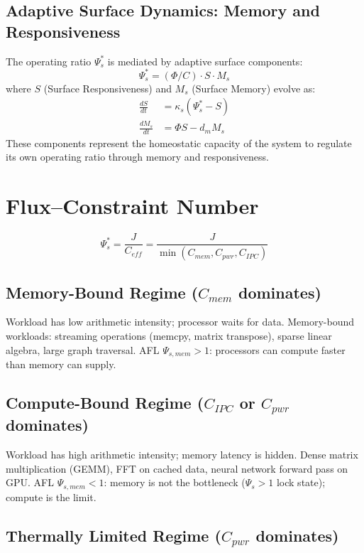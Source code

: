 \documentclass[11pt]{article}
\begin{document}
\subsection{Adaptive Surface Dynamics: Memory and Responsiveness}

The operating ratio $\Psi_s^*$ is mediated by adaptive surface components:
\begin{equation}
\Psi_s^* = (\Phi/C) \cdot S \cdot M_s
\end{equation}
where $S$ (Surface Responsiveness) and $M_s$ (Surface Memory) evolve as:
\begin{align}
\frac{dS}{dt} &= \kappa_s (\Psi_s^* - S) \\
\frac{dM_s}{dt} &= \Phi S - d_m M_s
\end{align}
These components represent the homeostatic capacity of the system to regulate its own operating ratio through memory and responsiveness.

\section{Flux--Constraint Number}

\begin{equation}
\Psi_s^* = \frac{J}{C_{eff}} = \frac{J}{\min(C_{mem}, C_{pwr}, C_{IPC})}
\end{equation}

\subsection{Memory-Bound Regime ($C_{mem}$ dominates)}

Workload has low arithmetic intensity; processor waits for data. Memory-bound workloads:
streaming operations (memcpy, matrix transpose), sparse linear algebra, large graph traversal.
AFL $\Psi_{s,mem} > 1$: processors can compute faster than memory can supply.

\subsection{Compute-Bound Regime ($C_{IPC}$ or $C_{pwr}$ dominates)}

Workload has high arithmetic intensity; memory latency is hidden. Dense matrix multiplication
(GEMM), FFT on cached data, neural network forward pass on GPU. AFL $\Psi_{s,mem} < 1$:
memory is not the bottleneck ($\Psi_s > 1$ lock state); compute is the limit.

\subsection{Thermally Limited Regime ($C_{pwr}$ dominates)}
\end{document}
